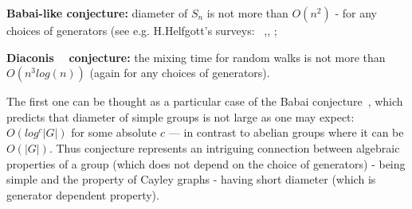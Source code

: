 \documentclass[atmp]{ipart_v1}
\numberwithin{equation}{section}
\theoremstyle{plain}%
\begin{document}
{\bf Babai-like conjecture:} diameter of  $S_n$ is not more than $O(n^{2})$ - for any choices of generators (see e.g. H.Helfgott's surveys: ~\cite{helfgott2014diameter},\cite{helfgott2019growth},\cite{helfgott2015random} ; 

{\bf Diaconis ~\cite{diaconis2013some} conjecture:}  the mixing time for random walks is not more than $O(n^{3}log(n))$ (again for any choices of generators). 

The first one can be thought as a particular case of the Babai conjecture~\cite{babai1992diameter},\cite{tao2015expansion} which predicts that diameter of simple groups is not  large as one may expect: $O(log^c|G|)$ for some absolute $c$ --- in contrast to abelian groups where it can be $O(|G|)$.  Thus conjecture represents an intriguing connection between algebraic properties of a group (which does not depend on the choice of generators) - being simple  and the  property of Cayley graphs - having short diameter (which is generator dependent property). 




 
\end{document}
